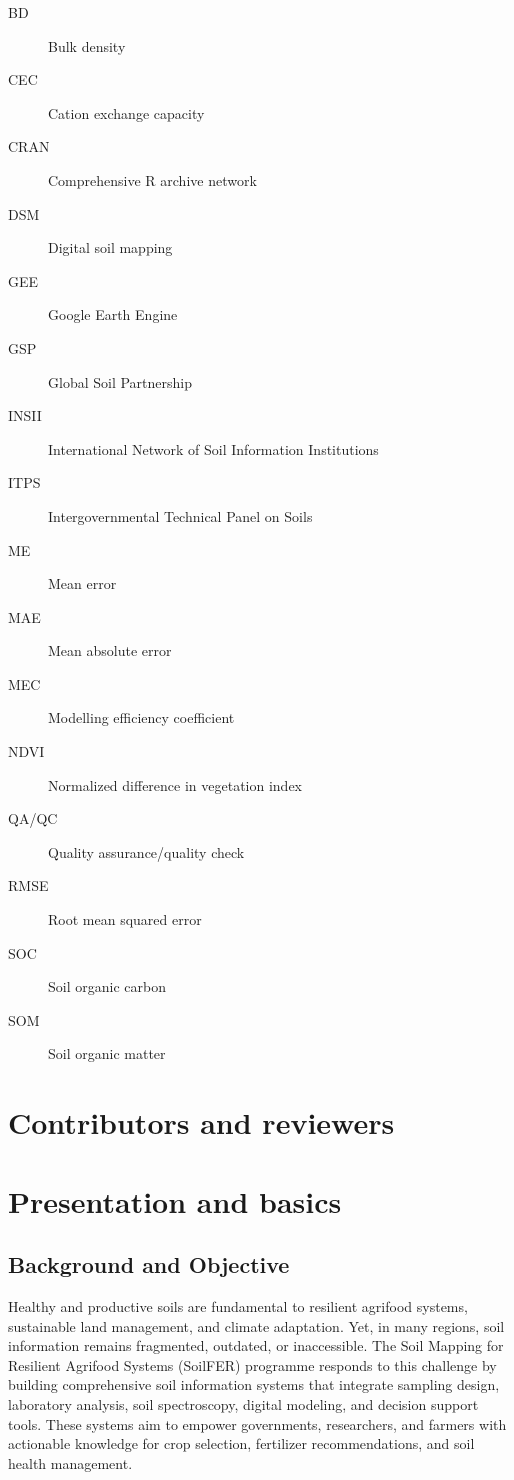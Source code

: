 \documentclass[
  10pt,
  b5paper,
  oneside]{book}
\begin{document}
\begin{description}
\item[BD]
Bulk density
\item[CEC]
Cation exchange capacity
\item[CRAN]
Comprehensive R archive network
\item[DSM]
Digital soil mapping
\item[GEE]
Google Earth Engine
\item[GSP]
Global Soil Partnership
\item[INSII]
International Network of Soil Information Institutions
\item[ITPS]
Intergovernmental Technical Panel on Soils
\item[ME]
Mean error
\item[MAE]
Mean absolute error
\item[MEC]
Modelling efficiency coefficient
\item[NDVI]
Normalized difference in vegetation index
\item[QA/QC]
Quality assurance/quality check
\item[RMSE]
Root mean squared error
\item[SOC]
Soil organic carbon
\item[SOM]
Soil organic matter
\end{description}

\chapter*{Contributors and reviewers}\label{contributors-and-reviewers}

\chapter*{Presentation and basics}\label{presentation-and-basics}

\section*{Background and Objective}\label{background-and-objective}

Healthy and productive soils are fundamental to resilient agrifood systems, sustainable land management, and climate adaptation. Yet, in many regions, soil information remains fragmented, outdated, or inaccessible. The Soil Mapping for Resilient Agrifood Systems (SoilFER) programme responds to this challenge by building comprehensive soil information systems that integrate sampling design, laboratory analysis, soil spectroscopy, digital modeling, and decision support tools. These systems aim to empower governments, researchers, and farmers with actionable knowledge for crop selection, fertilizer recommendations, and soil health management.
\end{document}
